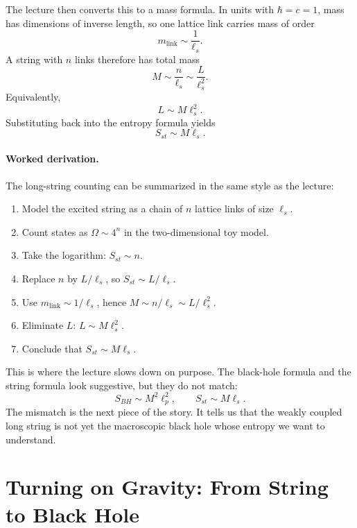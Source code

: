 The lecture then converts this to a mass formula. In units with \(\hbar=c=1\), mass has dimensions of inverse length, so one lattice link carries mass of order
\begin{equation}
m_{\text{link}}\sim \frac{1}{\ell_s}.
\end{equation}
A string with \(n\) links therefore has total mass
\begin{equation}
M\sim \frac{n}{\ell_s}\sim \frac{L}{\ell_s^2}.
\end{equation}
Equivalently,
\begin{equation}
L\sim M\ell_s^2.
\end{equation}
Substituting back into the entropy formula yields
\begin{equation}
S_{st}\sim M\ell_s.
\end{equation}

\paragraph{Worked derivation.}
The long-string counting can be summarized in the same style as the lecture:
\begin{enumerate}
\item Model the excited string as a chain of \(n\) lattice links of size \(\ell_s\).
\item Count states as \(\Omega\sim 4^n\) in the two-dimensional toy model.
\item Take the logarithm: \(S_{st}\sim n\).
\item Replace \(n\) by \(L/\ell_s\), so \(S_{st}\sim L/\ell_s\).
\item Use \(m_{\text{link}}\sim 1/\ell_s\), hence \(M\sim n/\ell_s\sim L/\ell_s^2\).
\item Eliminate \(L\): \(L\sim M\ell_s^2\).
\item Conclude that \(S_{st}\sim M\ell_s\).
\end{enumerate}

This is where the lecture slows down on purpose. The black-hole formula and the string formula look suggestive, but they do not match:
\begin{equation}
S_{BH}\sim M^2\ell_p^2,
\qquad
S_{st}\sim M\ell_s.
\end{equation}
The mismatch is the next piece of the story. It tells us that the weakly coupled long string is not yet the macroscopic black hole whose entropy we want to understand.

\section{Turning on Gravity: From String to Black Hole}

